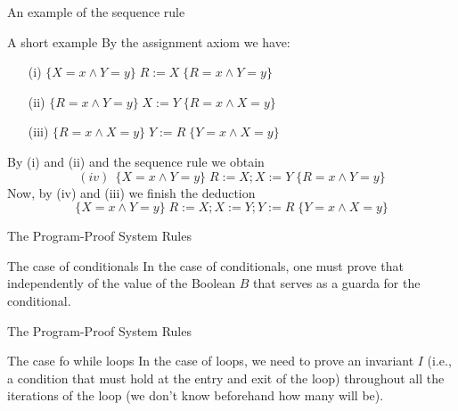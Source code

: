\documentclass[aspectratio=169]{beamer}
\begin{document}
\begin{frame}{An example of the sequence rule}
  \begin{block}{A short example}
  By the assignment axiom we have:
  \begin{itemize}
  \item [(i)]$\{X = x \land Y = y\}\;R := X\;\{R=x \land Y=y\}$ 
  \item [(ii)]$\{R = x \land Y = y\}\;X := Y\;\{R=x \land X=y\}$
  \item [(iii)]$\{R = x \land X = y\}\;Y := R\;\{Y=x \land X=y\}$
  \end{itemize}
  By (i) and (ii) and the sequence rule we obtain
  $$(iv)\:\:\{X = x \land Y = y\}\;R := X; X := Y\;\{R=x \land Y=y\}$$
  Now, by (iv) and (iii) we finish the deduction
  $$\{X = x \land Y = y\}\;R := X; X := Y;Y := R\;\{Y=x \land X=y\}$$
  \end{block}
\end{frame}


\begin{frame}[fragile]{The Program-Proof System Rules}
  \begin{block}{The case of conditionals}
  In the case of conditionals, one must prove that independently of the value of the Boolean $B$ that serves as a guarda for the conditional. 
    \begin{prooftree}
    \end{prooftree}
  \end{block}


\end{frame}

\begin{frame}[fragile]{The Program-Proof System Rules}
  \begin{block}{The case fo while loops}
  In the case of loops, we need to prove an invariant $I$ (i.e., a condition that must hold at the entry and exit of the loop) throughout all the iterations of the loop (we don't know beforehand how many will be). 
    \begin{prooftree}
    \end{prooftree}
  \end{block}
\end{frame}
\end{document}
